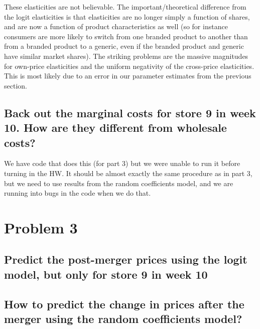 \documentclass[dvipsnames]{article}
\begin{document}
\begin{table}[htp]
  \centering
    
\end{table}

These elasticities are not believable. The important/theoretical difference from the logit elasticities is that elasticities are no longer simply a function of shares, and are now a function of product characteristics as well (so for instance consumers are more likely to switch from one branded product to another than from a branded product to a generic, even if the branded product and generic have similar market shares). The striking problems are the massive magnitudes for own-price elasticities and the uniform negativity of the cross-price elasticities. This is most likely due to an error in our parameter estimates from the previous section.

\subsection*{Back out the marginal costs for store 9 in week 10. How are they different from wholesale costs?}

We have code that does this (for part 3) but we were unable to run it before turning in the HW. It should be almost exactly the same procedure as in part 3, but we need to use results from the random coefficients model, and we are running into bugs in the code when we do that.

\newpage
\section*{Problem 3}
\subsection*{Predict the post-merger prices using the logit model, but only for store 9 in week 10}

\begin{table}[htp]
  \centering
  
\end{table}

\subsection*{How to predict the change in prices after the merger using the random coefficients model?}
\end{document}
